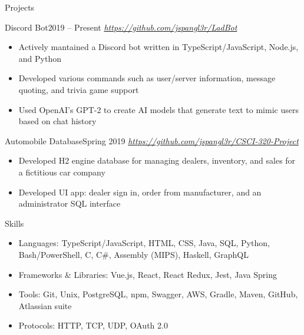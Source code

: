 \documentclass[]{mcdowellcv}
\begin{document}
	\begin{cvsection}{Projects}
		\begin{cvsubsection}{Discord Bot}{}{2019 -- Present}
			\textit{\url{https://github.com/jspangl3r/LadBot}}
			\begin{itemize}
				\item Actively mantained a Discord bot written in TypeScript/JavaScript, Node.js, and Python
				\item Developed various commands such as user/server information, message quoting, and trivia game support
				\item Used OpenAI's GPT-2 to create AI models that generate text to mimic users based on chat history
			\end{itemize}
		\end{cvsubsection}

		\begin{cvsubsection}{Automobile Database}{}{Spring 2019}
			\textit{\url{https://github.com/jspangl3r/CSCI-320-Project}}
			\begin{itemize}
				\item Developed H2 engine database for managing dealers, inventory, and sales for a fictitious car company
				\item Developed UI app: dealer sign in, order from manufacturer, and an administrator SQL interface
			\end{itemize}
		\end{cvsubsection}
	\end{cvsection}

	\begin{cvsection}{Skills}
		\begin{cvsubsection}{}{}{}	
			\begin{itemize}
				\item Languages: TypeScript/JavaScript, HTML, CSS, Java, SQL, Python, Bash/PowerShell, C, C\#, Assembly (MIPS), Haskell, GraphQL
				\item Frameworks \& Libraries: Vue.js, React, React Redux, Jest, Java Spring
				\item Tools: Git, Unix, PostgreSQL, npm, Swagger, AWS, Gradle, Maven, GitHub, Atlassian suite
				\item Protocols: HTTP, TCP, UDP, OAuth 2.0
			\end{itemize}
		\end{cvsubsection}
	\end{cvsection}
	
\end{document}
